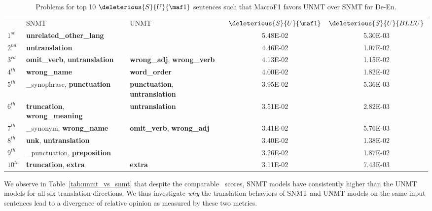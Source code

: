 \begin{table*}[t]
    \centering
    \footnotesize
    \begin{tabular}{lllcc}
    
& SNMT & UNMT &$\deleterious{S}{U}{\maf1}$&$\deleterious{S}{U}{BLEU}$\\ 
$1^{st}$ &\textbf{unrelated\_other\_lang}&&5.48E-02&5.30E-03\\
$2^{nd}$ &\textbf{untranslation}&&4.46E-02&1.07E-02\\
$3^{rd}$ &\textbf{omit\_verb}, \textbf{untranslation}&	\textbf{wrong\_adj}, \textbf{wrong\_verb}&4.13E-02&1.15E-02\\
$4^{th}$ &\textbf{wrong\_name}&	\textbf{word\_order}& 4.00E-02&1.82E-02\\
$5^{th}$ &\_synophrase, \textbf{punctuation}&	\textbf{punctuation}, \textbf{untranslation}& 3.95E-02&5.36E-03\\
$6^{th}$ &\textbf{truncation}, \textbf{wrong\_meaning}&	\textbf{untranslation}& 3.51E-02&2.82E-03\\
$7^{th}$ &\_synonym, \textbf{wrong\_name}&	\textbf{omit\_verb}, \textbf{wrong\_adj}& 3.41E-02&5.76E-03\\
$8^{th}$ &\textbf{unk}, \textbf{untranslation}&	&3.40E-02&1.38E-02\\
$9^{th}$ &\_punctuation, \textbf{preposition}&&3.26E-02&1.87E-02\\
$10^{th}$ &\textbf{truncation}, \textbf{extra}&	\textbf{extra}&3.11E-02&7.43E-03\\ 
    \end{tabular}
    \caption{Problems for top 10 $\deleterious{S}{U}{\maf1}$ sentences such that MacroF1 favors UNMT over SNMT for De-En. }
    \label{tab:unmt_better_mf1}
\end{table*}


We observe in Table~\ref{tab:unmt_vs_snmt} that despite the comparable \bleu\ scores,  SNMT models have consistently higher  than the UNMT models for all six translation directions. 
We thus investigate \textit{why} the translation behaviors of SNMT and UNMT models on the same input sentences lead to a divergence of relative opinion as measured by these two metrics.

